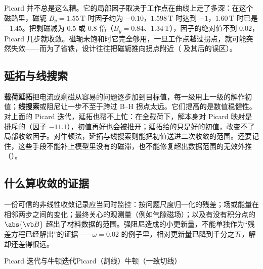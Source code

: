 Picard 并不总是这么糟。它的局部因子取决于工作点在曲线上走了多深：在这个磁路里，磁轭 $B_y=1.55\,\mathrm T$ 时因子约为 $-0.10$，$1.598\,\mathrm T$ 时达到 $-1$，$1.60\,\mathrm T$ 时已是 $-1.45$。把剩磁减为 $0.5$ 或 $0.8$ 倍（$B_y=0.84$、$1.34\,\mathrm T$），因子的绝对值不到 $0.02$，Picard 几步就收敛。磁轭未饱和时它完全够用，一旦工作点越过拐点，就可能突然失效——而为了省铁，设计往往把磁轭推向拐点附近（ 及其后的误区）。

\subsection{延拓与线搜索}
\textbf{载荷延拓}把电流或剩磁从容易的问题逐步加到目标值，每一级用上一级的解作初值；\textbf{线搜索}或阻尼让一步不至于跨过 B--H 拐点太远。它们提高的是数值稳健性。对上面的 Picard 迭代，延拓也帮不上忙：在全载荷下，解本身对 Picard 映射是排斥的（因子 $-11.1$），初值再好也会被推开；延拓给的只是好的初值，改变不了局部收敛因子。对牛顿法，延拓与线搜索则能把初值送进二次收敛的范围。还要记住，这些手段不能补上模型里没有的磁滞，也不能修复超出数据范围的无效外推（）。

\subsection{什么算收敛的证据}
一份可信的非线性收敛记录应当同时监控：按问题尺度归一化的残差；场或能量在相邻两步之间的变化；最终关心的观测量（例如气隙磁场）；以及有没有积分点的 $\abs{\vb B}$ 超出了材料数据的范围。强阻尼造成的小更新量，不能单独作为“残差方程已经解出”的证据——$\omega=0.02$ 的例子里，相对更新量已降到千分之五，解却还差得很远。

\begin{compare}{Picard 迭代与牛顿迭代}{Picard（割线）}{牛顿（一致切线）}
\end{compare}

